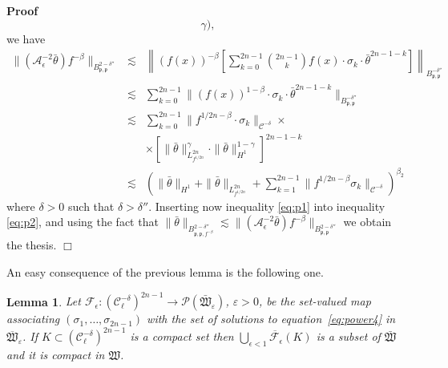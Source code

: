 \documentclass[a4paper,10pt]{article}
\newenvironment{proof}{\noindent\textbf{Proof\ }}{\hspace*{\fill}$\Box$\medskip}
\newtheorem{lemma}[theorem]{Lemma}
\begin{document}
\begin{proof}
\begin{equation}
    \gamma), \label{eq:beta}
  \end{equation}
  we have
  \begin{equation}
    \begin{array}{lll}
      \| (\mathcal{A}_{\epsilon}^{- 2} \bar{\theta}) f^{- \beta} \|_{B^{2 -
      \delta''}_{\mathfrak{p}, \mathfrak{p}}} & \lesssim & \left\| (f (x))^{-
      \beta} \left[ \sum_{k = 0}^{2 n - 1} \binom{2 n - 1}{k} f (x) \cdot
      \sigma_k \cdot \bar{\theta}^{2 n - 1 - k} \right] \right\|_{B^{-
      \delta''}_{\mathfrak{p, \mathfrak{p}}}}\\
      & \lesssim & \sum_{k = 0}^{2 n - 1} \| (f (x))^{1 - \beta} \cdot
      \sigma_k \cdot \bar{\theta}^{2 n - 1 - k} \|_{B^{-
      \delta''}_{\mathfrak{p, \mathfrak{p}}}}\\
      & \lesssim & \sum_{k = 0}^{2 n - 1} \| f^{1 / 2 n - \beta} \cdot
      \sigma_k \|_{\mathcal{C}^{- \delta}} \times\\
      &  & \times \left[ \| \bar{\theta} \|_{L^{2 n}_{f^{1 / 2 n}}}^{\gamma}
      \cdot \| \bar{\theta} \|^{1 - \gamma}_{H^1} \right]^{2 n - 1 - k}\\
      & \lesssim & \left( \| \bar{\theta} \|_{H^1} + \| \bar{\theta} \|_{L^{2
      n}_{f^{1 / 2 n}}} + \sum_{k = 1}^{2 n - 1} \| f^{1 / 2 n - \beta}
      \sigma_k \|_{\mathcal{C}^{- \delta}} \right)^{\beta_2}
    \end{array} \label{eq:p2}
  \end{equation}
  where $\delta > 0$ such that $\delta > \delta''$. Inserting now inequality
  {\eqref{eq:p1}} into inequality {\eqref{eq:p2}}, and using the fact that $\|
  \bar{\theta} \|_{B^{2 - \delta''}_{\mathfrak{p}, \mathfrak{p}, f^{- \beta}}}
  \lesssim \| (\mathcal{A}_{\epsilon}^{- 2} \bar{\theta}) f^{- \beta} \|_{B^{2
  - \delta''}_{\mathfrak{p}, \mathfrak{p}}}$ we obtain the thesis.
\end{proof}

An easy consequence of the previous lemma is the following one.

\begin{lemma}
  \label{lemma_powercompact}Let $\mathcal{F}_{\epsilon} : (\mathcal{C}^{-
  \delta}_{\ell})^{2 n - 1} \rightarrow \mathcal{P}
  (\mathfrak{\bar{W}_{\varepsilon}})$, $\varepsilon > 0$, be the set-valued
  map associating $(\sigma_1, \ldots, \sigma_{2 n - 1})$ with the set of
  solutions to equation~{\eqref{eq:power4}} in
  $\overline{\mathfrak{W}}_{\varepsilon}$. If $K \subset (\mathcal{C}^{-
  \delta}_{\ell})^{2 n - 1}$ is a compact set then
  $\overline{\bigcup_{\epsilon < 1} \mathcal{F}_{\epsilon} (K)}$ is a subset
  of $\mathfrak{\bar{W}}$ and it is compact in $\mathfrak{W}$.
\end{lemma}
\end{document}
